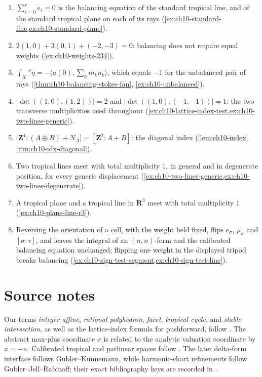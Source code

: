 \begin{enumerate}
\item $\sum_{i=0}^re_i=0$ is the balancing equation of the standard tropical
      line, and of the standard tropical plane on each of its rays
      (\cref{ex:ch10-standard-line,ex:ch10-standard-plane}).
\item $2(1,0)+3(0,1)+(-2,-3)=0$: balancing does not require equal weights
      (\cref{ex:ch10-weights-234}).
\item $\int_X\dprime\eta=-\langle a(0),\sum_km_ku_k\rangle$, which equals
      $-1$ for the unbalanced pair of rays
      (\cref{thm:ch10-balancing-stokes-fan},
       \cref{ex:ch10-unbalanced}).
\item $|\det((1,0),(1,2))|=2$ and $|\det((1,0),(-1,-1))|=1$: the two
      transverse multiplicities used throughout
      (\cref{ex:ch10-lattice-index-test,ex:ch10-two-lines-generic}).
\item $\bigl[\mathbf Z^4:(A\oplus B)+N_\Delta\bigr]=[\mathbf Z^2:A+B]$: the
      diagonal index
      (\cref{lem:ch10-index}\,\cref{itm:ch10-idx-diagonal}).
\item Two tropical lines meet with total multiplicity $1$, in general and in
      degenerate position, for every generic displacement
      (\cref{ex:ch10-two-lines-generic,ex:ch10-two-lines-degenerate}).
\item A tropical plane and a tropical line in $\mathbf R^3$ meet with total
      multiplicity $1$ (\cref{ex:ch10-plane-line-r3}).
\item Reversing the orientation of a cell, with the weight held fixed, flips
      $e_\sigma$, $\mu_\sigma$ and $[\sigma:\tau]$, and leaves the integral
      of an $(n,n)$-form and the calibrated balancing equation unchanged;
      flipping one weight in the displayed tripod breaks balancing
      (\cref{ex:ch10-sign-test-segment,ex:ch10-sign-test-line}).
\end{enumerate}

\section*{Source notes}

Our terms \emph{integer affine}, \emph{rational polyhedron}, \emph{facet},
\emph{tropical cycle}, and \emph{stable intersection}, as well as the
lattice-index formula for pushforward, follow
\cite[\S\S1.3, 2.1, 4.2--4.3 and 4.6]{MR18Tropical}.  The abstract
max-plus coordinate $x$ is related to the analytic valuation coordinate by
$x=-u$.  Calibrated tropical and parlinear spaces follow
\cite[\S\S3--6]{CLD25}. The later delta-form interface follows
Gubler--Künnemann, while harmonic-chart refinements follow
Gubler--Jell--Rabinoff; their exact bibliography keys are recorded in
.

